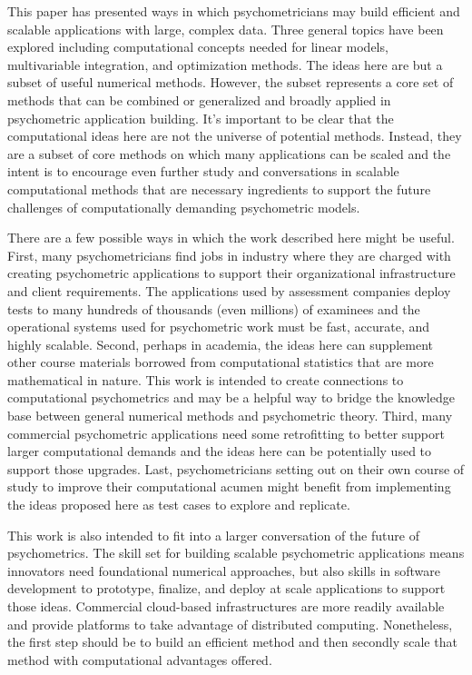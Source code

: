 \documentclass[12pt]{article}
\begin{document}
This paper has presented ways in which psychometricians may build efficient and scalable applications with large, complex data. Three general topics have been explored including computational concepts needed for linear models, multivariable integration, and optimization methods. The ideas here are but a subset of useful numerical methods. However, the subset represents a core set of methods that can be combined or generalized and broadly applied in psychometric application building. It's important to be clear that the computational ideas here are not the universe of potential methods. Instead, they are a subset of core methods on which many applications can be scaled and the intent is to encourage even further study and conversations in scalable computational methods that are necessary ingredients to support the future challenges of computationally demanding psychometric models. 

There are a few possible ways in which the work described here might be useful. First, many psychometricians find jobs in industry where they are charged with creating psychometric applications to support their organizational infrastructure and client requirements. The applications used by assessment companies deploy tests to many hundreds of thousands (even millions) of examinees and the operational systems used for psychometric work must be fast, accurate, and highly scalable. Second, perhaps in academia, the ideas here can supplement other course materials borrowed from computational statistics that are more mathematical in nature. This work is intended to create connections to computational psychometrics and may be a helpful way to bridge the knowledge base between general numerical methods and psychometric theory. Third, many commercial psychometric applications need some retrofitting to better support larger computational demands and the ideas here can be potentially used to support those upgrades. Last, psychometricians setting out on their own course of study to improve their computational acumen might benefit from implementing the ideas proposed here as test cases to explore and replicate.

This work is also intended to fit into a larger conversation of the future of psychometrics. The skill set for building scalable psychometric applications means innovators need foundational numerical approaches, but also skills in software development to prototype, finalize, and deploy at scale applications to support those ideas. Commercial cloud-based infrastructures are more readily available and provide platforms to take advantage of distributed computing. Nonetheless, the first step should be to build an efficient method and then secondly scale that method with computational advantages offered.
\end{document}
